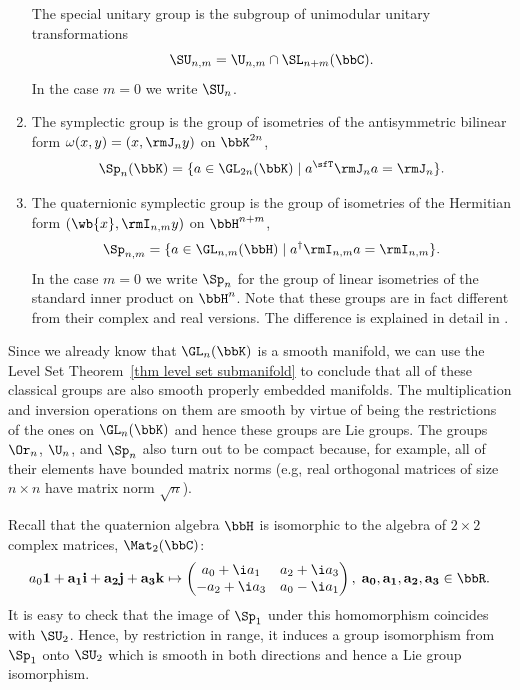 \begin{example}
\begin{enumerate}
        The special unitary group is the subgroup of unimodular unitary transformations
        \[\SU_{n,m}=\U_{n,m}\cap \SL_{n+m}(\bbC).\]
        In the case $m=0$ we write $\SU_n$.
        \item The symplectic group is the group of isometries of the antisymmetric bilinear form $\omega(x,y)=(x,\rmJ_n y)$ on $\bbK^{2n}$,
        \[\Sp_n(\bbK)=\{a\in\GL_{2n}(\bbK)\mid a^\sfT  \rmJ_n a=\rmJ_n\}.\]
        \item The quaternionic symplectic group is the group of isometries of the Hermitian form $(\wb{x},\rmI_{n,m}y)$ on $\bbH^{n+m}$,
        \[\Sp_{n,m}=\{a\in\GL_{n,m}(\bbH)\mid a^\dagger \rmI_{n,m}a=\rmI_{n,m}\}.\]
        In the case $m=0$ we write $\Sp_n$ for the group of linear isometries of the standard inner product on $\bbH^n$. Note that these groups are in fact different from their complex and real versions. The difference is explained in detail in \cite[pp.~5-6]{Sepanski}.
    \end{enumerate}
\end{example}

Since we already know that $\GL_n(\bbK)$ is a smooth manifold, we can use the Level Set Theorem~\ref{thm level set submanifold} to conclude that all of these classical groups are also smooth properly embedded manifolds. The multiplication and inversion operations on them are smooth by virtue of being the restrictions of the ones on $\GL_n(\bbK)$ and hence these groups are Lie groups. The groups $\Or_n$, $\U_n$, and $\Sp_n$ also turn out to be compact because, for example, all of their elements have bounded matrix norms (e.g, real orthogonal matrices of size $n\times n$ have matrix norm $\sqrt{n}$).


\begin{example}[$\SU_2\cong \Sp_1$]
    Recall that the quaternion algebra $\bbH$ is isomorphic to the algebra of $2\times 2$ complex matrices, $\Mat_2(\bbC)$:
    \[a_0 \bf{1}+a_1 \bf{i}+a_2 \bf{j}+a_3 \bf{k}\mapsto
    \begin{pmatrix}
        a_0+\i a_1&a_2+\i a_3\\
        -a_2+\i a_3&a_0-\i a_1
    \end{pmatrix}, \; a_0,a_1,a_2,a_3\in\bbR.\label{46939}
    \]
    It is easy to check that the image of $\Sp_1$ under this homomorphism coincides with $\SU_2$. Hence, by restriction in range, it induces a group isomorphism from $\Sp_1$ onto $\SU_2$ which is smooth in both directions and hence a Lie group isomorphism.
\end{example}

